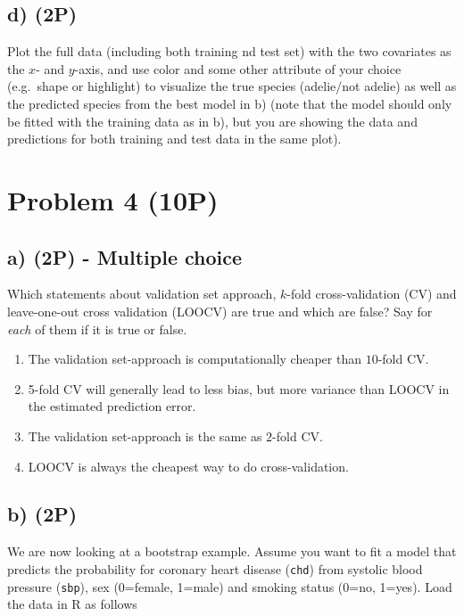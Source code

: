 \documentclass[
]{article}
\providecommand{\tightlist}{%
  \setlength{\itemsep}{0pt}\setlength{\parskip}{0pt}}
\begin{document}
\hypertarget{d-2p}{%
\subsection{d) (2P)}\label{d-2p}}

Plot the full data (including both training nd test set) with the two
covariates as the \(x\)- and \(y\)-axis, and use color and some other
attribute of your choice (e.g.~shape or highlight) to visualize the true
species (adelie/not adelie) as well as the predicted species from the
best model in b) (note that the model should only be fitted with the
training data as in b), but you are showing the data and predictions for
both training and test data in the same plot).

\hypertarget{problem-4-10p}{%
\section{Problem 4 (10P)}\label{problem-4-10p}}

\hypertarget{a-2p---multiple-choice}{%
\subsection{a) (2P) - Multiple choice}\label{a-2p---multiple-choice}}

Which statements about validation set approach, \(k\)-fold
cross-validation (CV) and leave-one-out cross validation (LOOCV) are
true and which are false? Say for \emph{each} of them if it is true or
false.

\begin{enumerate}
\def\labelenumi{(\roman{enumi})}
\tightlist
\item
  The validation set-approach is computationally cheaper than
  \(10\)-fold CV.
\item
  5-fold CV will generally lead to less bias, but more variance than
  LOOCV in the estimated prediction error.
\item
  The validation set-approach is the same as \(2\)-fold CV.
\item
  LOOCV is always the cheapest way to do cross-validation.
\end{enumerate}

\hypertarget{b-2p}{%
\subsection{b) (2P)}\label{b-2p}}

We are now looking at a bootstrap example. Assume you want to fit a
model that predicts the probability for coronary heart disease
(\texttt{chd}) from systolic blood pressure (\texttt{sbp}), sex
(0=female, 1=male) and smoking status (0=no, 1=yes). Load the data in R
as follows
\end{document}
